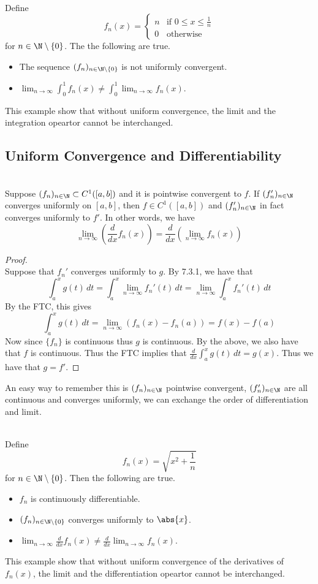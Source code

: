 \documentclass[a4paper]{article}
\begin{document}
\begin{eg}{}{}\\ Define $$f_n(x)=\begin{cases}
n & \text{if }0\leq x\leq\frac{1}{n}\\
0 & \text{otherwise }
\end{cases}$$ for $n\in\N\setminus\{0\}$. The the following are true. 
\begin{itemize}
\item The sequence $(f_n)_{n\in\N\setminus\{0\}}$ is not uniformly convergent. 
\item $\lim_{n\to\infty}\int_0^1f_n(x)\neq\int_0^1\lim_{n\to\infty}f_n(x)$. 
\end{itemize}
This example show that without uniform convergence, the limit and the integration opeartor cannot be interchanged. 
\end{eg}

\subsection{Uniform Convergence and Differentiability}
\begin{thm}{}{}\\ Suppose $(f_n)_{n\in\N}\subset C^1([a,b])$ and it is pointwise convergent to $f$. If $(f_n')_{n\in\N}$ converges uniformly on $[a,b]$, then $f\in C^1([a,b])$ and $(f_n')_{n\in\N}$ in fact converges uniformly to $f'$. In other words, we have $$\lim_{n\to\infty}\left(\frac{d}{dx}f_n(x)\right)=\frac{d}{dx}\left(\lim_{n\to\infty}f_n(x)\right)$$ 
\begin{proof}\\ Suppose that $f_n'$ converges uniformly to $g$. By 7.3.1, we have that $$\int_a^xg(t)\,dt=\int_a^x\lim_{n\to\infty}f_n'(t)\,dt=\lim_{n\to\infty}\int_a^xf_n'(t)\,dt$$
By the FTC, this gives $$\int_a^xg(t)\,dt=\lim_{n\to\infty}(f_n(x)-f_n(a))=f(x)-f(a)$$
Now since $\{f_n\}$ is continuous thus $g$ is continuous. By the above, we also have that $f$ is continuous. Thus the FTC implies that $\frac{d}{dx}\int_a^xg(t)\,dt=g(x)$. Thus we have that $g=f'$. 
\end{proof}
\end{thm}

An easy way to remember this is $(f_n)_{n\in\N}$ pointwise convergent, $(f_n')_{n\in\N}$ are all continuous and converges uniformly, we can exchange the order of differentiation and limit. 

\begin{eg}{}{}\\ Define $$f_n(x)=\sqrt{x^2+\frac{1}{n}}$$ for $n\in\N\setminus\{0\}$. Then the following are true. 
\begin{itemize}
\item $f_n$ is continuously differentiable. 
\item $(f_n)_{n\in\N\setminus\{0\}}$ converges uniformly to $\abs{x}$. 
\item $\lim_{n\to\infty}\frac{d}{dx}f_n(x)\neq\frac{d}{dx}\lim_{n\to\infty}f_n(x)$. 
\end{itemize}
This example show that without uniform convergence of the derivatives of $f_n(x)$, the limit and the differentiation opeartor cannot be interchanged. 
\end{eg}
\end{document}
